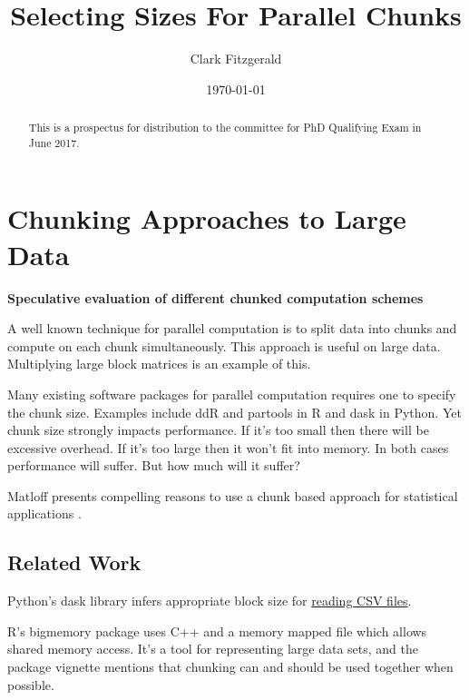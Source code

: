 \documentclass[12pt]{article}
\begin{document}
\title{Selecting Sizes For Parallel Chunks}
\date{\today}
\author{Clark Fitzgerald}
\maketitle

\begin{abstract}

    This is a prospectus for distribution to the committee for PhD
    Qualifying Exam in June 2017.

\end{abstract}


\section{Chunking Approaches to Large Data}

\textbf{Speculative evaluation of different chunked computation schemes}

A well known technique for parallel computation is to split data into
chunks and compute on each chunk simultaneously. This approach 
is useful on large data. Multiplying large block matrices is an example of this.

Many existing software packages for parallel computation requires one to specify the
chunk size. Examples include ddR \cite{R-ddR} and partools
\cite{R-partools} in R and dask in Python.
Yet chunk size strongly impacts
performance. If it's too small then there will be excessive overhead. If
it's too large then it won't fit into memory. In both cases performance
will suffer. But how much will it suffer?

Matloff presents compelling reasons to use a chunk based
approach for statistical applications \cite{matloff2014software}.

\subsection{Related Work}

Python's dask library infers appropriate block size for
\href{https://github.com/dask/dask/pull/1328}{reading CSV files}.

R's bigmemory package uses C++ and a memory mapped file which allows shared
memory access. \cite{kane2010bigmemory} It's a tool for representing large
data sets, and the package vignette mentions that chunking can and should
be used together when possible.
\end{document}
